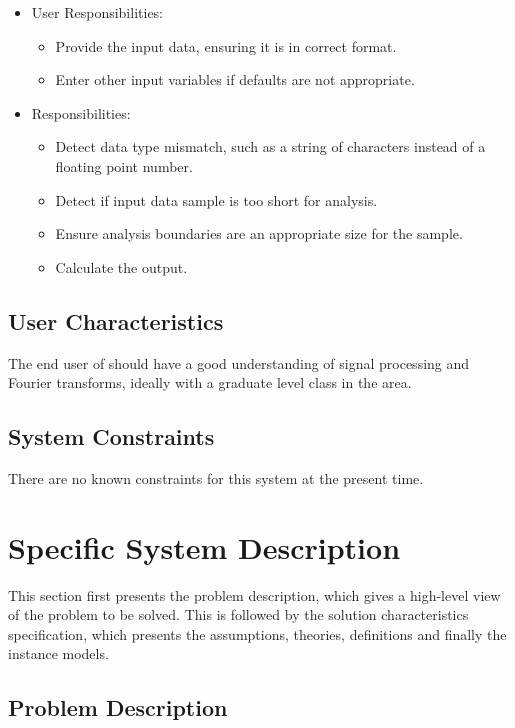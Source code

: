 \documentclass[12pt]{article}
\begin{document}
\begin{itemize}
\item User Responsibilities:
\begin{itemize}
\item Provide the input data, ensuring it is in correct format.
\item Enter other input variables if defaults are not appropriate.
\end{itemize}
\item \progname{} Responsibilities:
\begin{itemize}
\item Detect data type mismatch, such as a string of characters instead of a
  floating point number.
\item Detect if input data sample is too short for analysis.
\item Ensure analysis boundaries are an appropriate size for the sample.
\item Calculate the output.
\end{itemize}
\end{itemize}

\subsection{User Characteristics} \label{SecUserCharacteristics}
 
  The end user of \progname{} should have a good understanding of signal processing and Fourier transforms, ideally with a graduate level class in the area. 

\subsection{System Constraints}

There are no known constraints for this system at the present time. 

\section{Specific System Description}

This section first presents the problem description, which gives a high-level
view of the problem to be solved.  This is followed by the solution characteristics
specification, which presents the assumptions, theories, definitions and finally
the instance models. 

\subsection{Problem Description} \label{Sec_pd}
\end{document}
